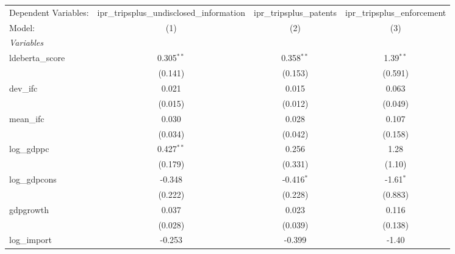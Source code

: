 
\begingroup
\centering
\begin{tabular}{lccc}
   \tabularnewline \midrule \midrule
   Dependent Variables:                  & ipr\_tripsplus\_undisclosed\_information    & ipr\_tripsplus\_patents   & ipr\_tripsplus\_enforcement\\    
   Model:                                & (1)                                         & (2)                       & (3)\\  
   \midrule
   \emph{Variables}\\
   ldeberta\_score                       & 0.305$^{**}$                                & 0.358$^{**}$              & 1.39$^{**}$\\   
                                         & (0.141)                                     & (0.153)                   & (0.591)\\   
   dev\_ifc                              & 0.021                                       & 0.015                     & 0.063\\   
                                         & (0.015)                                     & (0.012)                   & (0.049)\\   
   mean\_ifc                             & 0.030                                       & 0.028                     & 0.107\\   
                                         & (0.034)                                     & (0.042)                   & (0.158)\\   
   log\_gdppc                            & 0.427$^{**}$                                & 0.256                     & 1.28\\   
                                         & (0.179)                                     & (0.331)                   & (1.10)\\   
   log\_gdpcons                          & -0.348                                      & -0.416$^{*}$              & -1.61$^{*}$\\   
                                         & (0.222)                                     & (0.228)                   & (0.883)\\   
   gdpgrowth                             & 0.037                                       & 0.023                     & 0.116\\   
                                         & (0.028)                                     & (0.039)                   & (0.138)\\   
   log\_import                           & -0.253                                      & -0.399                    & -1.40\\   

\end{tabular}

